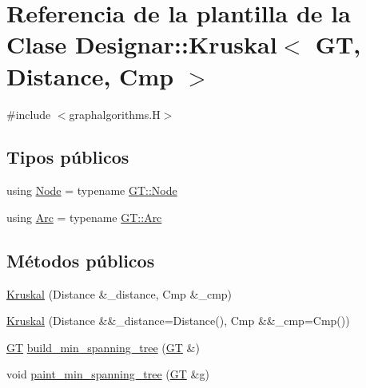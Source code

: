 \hypertarget{class_designar_1_1_kruskal}{}\section{Referencia de la plantilla de la Clase Designar\+:\+:Kruskal$<$ GT, Distance, Cmp $>$}
\label{class_designar_1_1_kruskal}


{\ttfamily \#include $<$graphalgorithms.\+H$>$}

\subsection*{Tipos públicos}
\begin{DoxyCompactItemize}
\item 
using \hyperlink{class_designar_1_1_kruskal_ae877bf49a387ddf132cfd824a0d258dd}{Node} = typename \hyperlink{class_designar_1_1_graph_a5dfc7dba9d092ac489c72e40390c37d0}{G\+T\+::\+Node}
\item 
using \hyperlink{class_designar_1_1_kruskal_a90eba06ada80f8b0b010782c15c0e52a}{Arc} = typename \hyperlink{class_designar_1_1_graph_a74c730ef4ce2d20f998d72bd25c2b5bf}{G\+T\+::\+Arc}
\end{DoxyCompactItemize}
\subsection*{Métodos públicos}
\begin{DoxyCompactItemize}
\item 
\hyperlink{class_designar_1_1_kruskal_a930c064f2563fa43125656f6a3646882}{Kruskal} (Distance \&\+\_\+distance, Cmp \&\+\_\+cmp)
\item 
\hyperlink{class_designar_1_1_kruskal_ae1108aacf254cb652fa16a8ba398e685}{Kruskal} (Distance \&\&\+\_\+distance=Distance(), Cmp \&\&\+\_\+cmp=Cmp())
\item 
\hyperlink{demo-buildgraph_8_c_a3001c40d2c31ca87ed96cd7d1334a55e}{GT} \hyperlink{class_designar_1_1_kruskal_ab5641dc38fc6385a0af6a82f8458b15b}{build\+\_\+min\+\_\+spanning\+\_\+tree} (\hyperlink{demo-buildgraph_8_c_a3001c40d2c31ca87ed96cd7d1334a55e}{GT} \&)
\item 
void \hyperlink{class_designar_1_1_kruskal_a2bab9970dc087501a1bf935396174512}{paint\+\_\+min\+\_\+spanning\+\_\+tree} (\hyperlink{demo-buildgraph_8_c_a3001c40d2c31ca87ed96cd7d1334a55e}{GT} \&g)
\end{DoxyCompactItemize}


